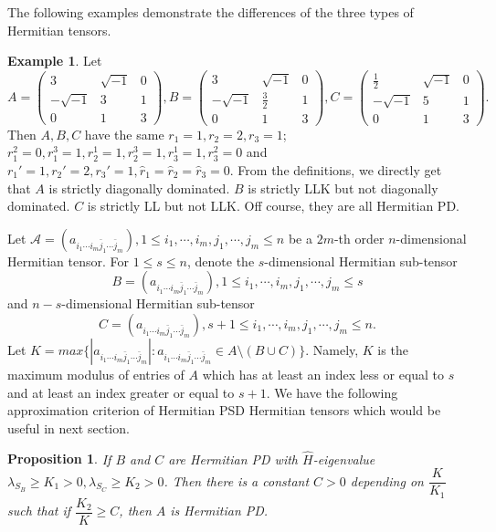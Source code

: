 \documentclass[10pt,reqno]{amsart}
\newtheorem{prop}[thm]{Proposition}
\theoremstyle{definition}
\newtheorem{exam}[thm]{Example}
\begin{document}
The following examples demonstrate the differences of the three types of Hermitian tensors.
\begin{exam}
Let $$A=\begin{pmatrix} 3 & \sqrt{-1} &0\\-\sqrt{-1}&3&1\\
0&1&3\end{pmatrix}, B=\begin{pmatrix} 3 & \sqrt{-1} &0\\-\sqrt{-1}&\frac{3}{2}&1\\
0&1&3\end{pmatrix},
C=\begin{pmatrix} \frac{1}{2} & \sqrt{-1} &0\\-\sqrt{-1}&5&1\\
0&1&3\end{pmatrix}.$$ Then $A, B, C$ have the same $r_1=1, r_2=2, r_3=1$; $r^2_1=0, r^3_1=1, r_2^1=1, r_2^3=1,r_3^1=1, r_3^2=0$ and $r_1'=1, r_2'=2, r_3'=1, \hat{r}_1=\hat{r}_2=\hat{r}_3=0$. From the definitions, we directly get that $A$ is strictly diagonally dominated. $B$ is strictly LLK but not diagonally dominated. $C$ is strictly LL but not LLK. Off course, they are all Hermitian PD.
\end{exam}
Let $\mathcal A=(a_{i_1\cdots i_m\bar{j}_1\cdots \bar{j}_m}), 1\leq i_1,\cdots, i_m,j_1,\cdots,j_m\leq n$ be a $2m$-th order $n$-dimensional Hermitian tensor. For $1\leq s\leq n$, denote the $s$-dimensional Hermitian sub-tensor $$B=(a_{i_1\cdots i_m\bar{j}_1\cdots \bar{j}_m}), 1\leq i_1,\cdots, i_m,j_1,\cdots,j_m\leq s$$ and $n-s$-dimensional Hermitian sub-tensor $$C=(a_{i_1\cdots i_m\bar{j}_1\cdots \bar{j}_m}), s+1\leq i_1,\cdots, i_m,j_1,\cdots,j_m\leq n.$$ Let $K=max\{|a_{i_1\cdots i_m\bar{j}_1\cdots \bar{j}_m}|: a_{i_1\cdots i_m\bar{j}_1\cdots \bar{j}_m}\in A\setminus (B\cup C)\}$. Namely, $K$ is the maximum modulus of entries of $A$ which has at least an index less or equal to $s$ and at least an index greater or equal to $s+1$. 
We have the following approximation criterion of Hermitian PSD Hermitian tensors which would be useful in next section.
\begin{prop}\label{p4.16}
If $B$ and $C$ are Hermitian PD with $\hat{H}$-eigenvalue $\lambda_{S_B}\geq K_1>0, \lambda_{S_C}\geq K_2>0$. Then there is a constant $C>0$ depending on $\dfrac{K}{K_1}$ such that if $\dfrac{K_2}{K}\geq C$, then $A$ is Hermitian PD.
\end{prop}
\end{document}
